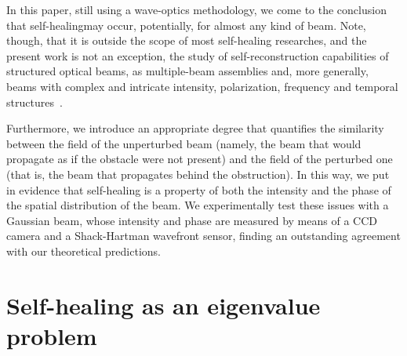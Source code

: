 \documentclass[10pt]{article}
\begin{document}
In this paper, still using a wave-optics methodology, we come to the
conclusion that self-healingmay occur, potentially, for almost any
kind of beam. Note, though, that it is outside the scope of most
self-healing researches, and the present work is not an exception, the
study of self-reconstruction capabilities of structured optical beams,
as multiple-beam assemblies and, more generally, beams with complex
and intricate intensity, polarization, frequency and temporal
structures~\cite{Andrews:2008aa}. 

Furthermore, we introduce an appropriate degree that quantifies
the similarity between the field of the unperturbed beam (namely, the
beam that would propagate as if the obstacle were not present) and the
field of the perturbed one (that is, the beam that propagates behind
the obstruction). In this way, we put in evidence that self-healing is a
property of both the intensity and the phase of the spatial
distribution of the beam. We experimentally test these issues with
a Gaussian beam, whose intensity and phase are measured by means
of a CCD camera and a Shack-Hartman wavefront sensor, finding an
outstanding agreement with our theoretical predictions.


\section{Self-healing as an eigenvalue problem}
\label{sec:eig}
\end{document}

